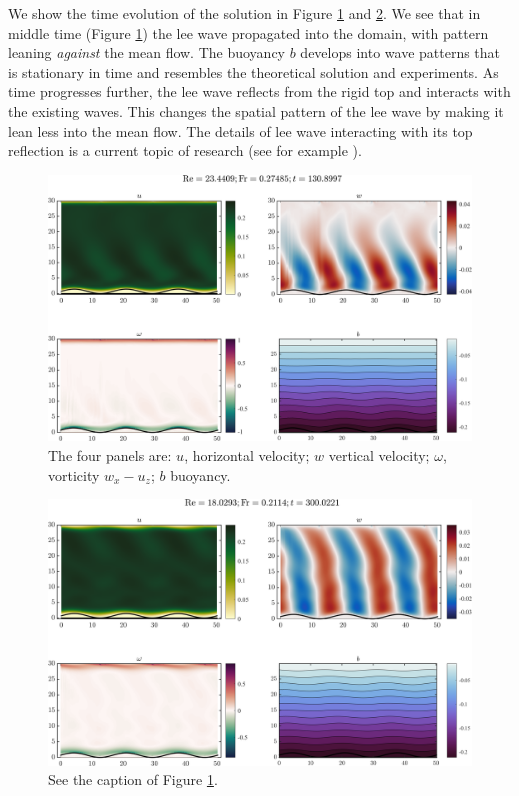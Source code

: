 \documentclass[11pt,letterpaper]{article}
\begin{document}
We show the time evolution of the solution in Figure \ref{fig:ib2D_23_t4000} and \ref{fig:ib2D_23_t9168}. We see that in middle time (Figure \ref{fig:ib2D_23_t4000}) the lee wave propagated into the domain, with pattern leaning \emph{against} the mean flow. The buoyancy $b$ develops into wave patterns that is stationary in time and resembles the theoretical solution and experiments. As time progresses further, the lee wave reflects from the rigid top and interacts with the existing waves. This changes the spatial pattern of the lee wave by making it lean less into the mean flow. The details of lee wave interacting with its top reflection is a current topic of research (see for example \cite{BakerMashayek_21}).
\begin{figure}
    \centering
    \includegraphics[width=\textwidth]{fig/ib2D_23_t4000}
    \caption{The four panels are: $u$, horizontal velocity; $w$ vertical velocity; $\omega$, vorticity $w_x-u_z$; $b$ buoyancy. }
    \label{fig:ib2D_23_t4000}
\end{figure}
\begin{figure}
    \centering
    \includegraphics[width=\textwidth]{fig/ib2D_23_t9168}
    \caption{See the caption of Figure \ref{fig:ib2D_23_t4000}.}
    \label{fig:ib2D_23_t9168}
\end{figure}
\end{document}
